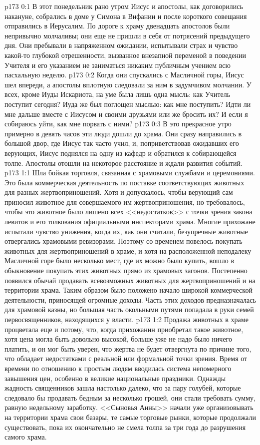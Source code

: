 \vs p173 0:1 В этот понедельник рано утром Иисус и апостолы, как договорились накануне, собрались в доме у Симона в Вифании и после короткого совещания отправились в Иерусалим. По дороге к храму двенадцать апостолов были непривычно молчаливы; они еще не пришли в себя от потрясений предыдущего дня. Они пребывали в напряженном ожидании, испытывали страх и чувство какой\hyp{}то глубокой отрешенности, вызванное внезапной переменой в поведении Учителя и его указанием не заниматься никаким публичным учением всю пасхальную неделю.
\vs p173 0:2 Когда они спускались с Масличной горы, Иисус шел впереди, а апостолы вплотную следовали за ним в задумчивом молчании. У всех, кроме Иуды Искариота, на уме была лишь одна мысль: как Учитель поступит сегодня? Иуда же был поглощен мыслью: как мне поступить? Идти ли мне дальше вместе с Иисусом и своими друзьями или же бросить их? И если я собираюсь уйти, как мне порвать с ними?
\vs p173 0:3 В это прекрасное утро примерно в девять часов эти люди дошли до храма. Они сразу направились в большой двор, где Иисус так часто учил, и, поприветствовав ожидавших его верующих, Иисус поднялся на одну из кафедр и обратился к собирающейся толпе. Апостолы отошли на некоторое расстояние и ждали развития событий.
\vs p173 1:1 Шла бойкая торговля, связанная с храмовыми службами и церемониями. Это была коммерческая деятельность по поставке соответствующих животных для разных жертвоприношений. Хотя и допускалось, чтобы верующий сам приносил животное для совершаемого им жертвоприношения, но требовалось, чтобы это животное было лишено всех <<недостатков>> с точки зрения закона левитов и его толкования официальными инспекторами храма. Многие прихожане испытали чувство унижения, когда их, как они считали, безупречные животные отвергались храмовыми ревизорами. Поэтому со временем повелось покупать животных для жертвоприношений в храме, и хотя на расположенной неподалеку Масличной горе было несколько мест, где их можно было купить, вошло в обыкновение покупать этих животных прямо из храмовых загонов. Постепенно появился обычай продавать всевозможных животных для жертвоприношений и на территории храма. Таким образом было положено начало широкой коммерческой деятельности, приносящей огромные доходы. Часть этих доходов предназначалась для храмовой казны, но большая часть окольными путями попадала в руки семей первосвященников, находящихся у власти.
\vs p173 1:2 Продажа животных в храме процветала еще и потому, что, когда прихожанин приобретал такое животное, хотя цена могла быть довольно высокой, больше уже не надо было ничего платить, и он мог быть уверен, что жертва не будет отвергнута по причине того, что обладает недостатками с реальной или формальной точки зрения. Время от времени по отношению к простым людям вводилась система непомерного завышения цен, особенно в великие национальные праздники. Однажды жадность священников зашла настолько далеко, что за пару голубей, которые следовало бы продавать бедным за несколько грошей, они стали требовать сумму, равную недельному заработку. <<Сыновья Анны>> начали уже организовывать на территории храма свои базары, те самые торговые рынки, которые продолжали существовать, пока их окончательно не смела толпа за три года до разрушения самого храма.
